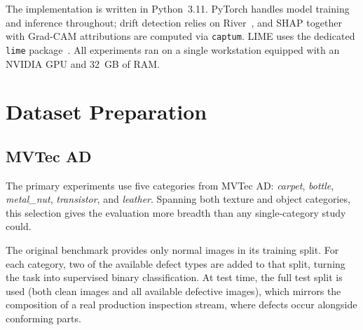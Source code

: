 



The implementation is written in Python~3.11. PyTorch handles model training and inference throughout; drift detection relies on River~\autocite{Montiel2021}, and SHAP together with Grad-CAM attributions are computed via \texttt{captum}. LIME uses the dedicated \texttt{lime} package~\autocite{Ribeiro2016}. All experiments ran on a single workstation equipped with an NVIDIA GPU and 32~GB of RAM.

\section{Dataset Preparation}
\label{sec:dataset-prep}

\subsection{MVTec AD}

The primary experiments use five categories from MVTec AD: \textit{carpet}, \textit{bottle}, \textit{metal\_nut}, \textit{transistor}, and \textit{leather}. Spanning both texture and object categories, this selection gives the evaluation more breadth than any single-category study could.

The original benchmark provides only normal images in its training split. For each category, two of the available defect types are added to that split, turning the task into supervised binary classification. At test time, the full test split is used (both clean images and all available defective images), which mirrors the composition of a real production inspection stream, where defects occur alongside conforming parts.

